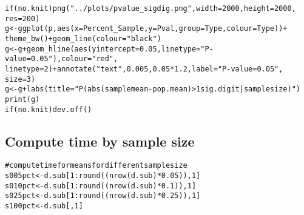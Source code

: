 \documentclass{article}\usepackage[]{graphicx}\usepackage[]{color}
\makeatletter
\newcommand{\hlnum}[1]{\textcolor[rgb]{0.863,0.196,0.184}{#1}}%
\newcommand{\hlstr}[1]{\textcolor[rgb]{0.863,0.196,0.184}{#1}}%
\newcommand{\hlcom}[1]{\textcolor[rgb]{0.345,0.431,0.459}{#1}}%
\newcommand{\hlopt}[1]{\textcolor[rgb]{0.576,0.631,0.631}{#1}}%
\newcommand{\hlstd}[1]{\textcolor[rgb]{0.514,0.58,0.588}{#1}}%
\newcommand{\hlkwa}[1]{\textcolor[rgb]{0.796,0.294,0.086}{#1}}%
\newcommand{\hlkwb}[1]{\textcolor[rgb]{0.522,0.6,0}{#1}}%
\newcommand{\hlkwc}[1]{\textcolor[rgb]{0.796,0.294,0.086}{#1}}%
\newcommand{\hlkwd}[1]{\textcolor[rgb]{0.576,0.631,0.631}{#1}}%
\newenvironment{kframe}{%
 \def\at@end@of@kframe{}%
 \ifinner\ifhmode%
  \def\at@end@of@kframe{\end{minipage}}%
  \begin{minipage}{\columnwidth}%
 \fi\fi%
 \def\FrameCommand##1{\hskip\@totalleftmargin \hskip-\fboxsep
 \colorbox{shadecolor}{##1}\hskip-\fboxsep
     \hskip-\linewidth \hskip-\@totalleftmargin \hskip\columnwidth}%
 \MakeFramed {\advance\hsize-\width
   \@totalleftmargin\z@ \linewidth\hsize
   \@setminipage}}%
 {\par\unskip\endMakeFramed%
 \at@end@of@kframe}
\newenvironment{knitrout}{}{} %
\makeatother
\begin{document}
\begin{knitrout}
\color{fgcolor}\begin{kframe}
\begin{alltt}
\hlkwa{if} \hlstd{(no.knit)} \hlkwd{png}\hlstd{(}\hlstr{"../plots/pvalue_sigdig.png"}\hlstd{,} \hlkwc{width} \hlstd{=} \hlnum{2000}\hlstd{,} \hlkwc{height} \hlstd{=} \hlnum{2000}\hlstd{,}
    \hlkwc{res} \hlstd{=} \hlnum{200}\hlstd{)}
\hlstd{g} \hlkwb{<-} \hlkwd{ggplot}\hlstd{(p,} \hlkwd{aes}\hlstd{(}\hlkwc{x} \hlstd{= Percent_Sample,} \hlkwc{y} \hlstd{= Pval,} \hlkwc{group} \hlstd{= Type,} \hlkwc{colour} \hlstd{= Type))} \hlopt{+}
    \hlkwd{theme_bw}\hlstd{()} \hlopt{+} \hlkwd{geom_line}\hlstd{(}\hlkwc{colour} \hlstd{=} \hlstr{"black"}\hlstd{)}
\hlstd{g} \hlkwb{<-} \hlstd{g} \hlopt{+} \hlkwd{geom_hline}\hlstd{(}\hlkwd{aes}\hlstd{(}\hlkwc{yintercept} \hlstd{=} \hlnum{0.05}\hlstd{,} \hlkwc{linetype} \hlstd{=} \hlstr{"P-value = 0.05"}\hlstd{),} \hlkwc{colour} \hlstd{=} \hlstr{"red"}\hlstd{,}
    \hlkwc{linetype} \hlstd{=} \hlnum{2}\hlstd{)} \hlopt{+} \hlkwd{annotate}\hlstd{(}\hlstr{"text"}\hlstd{,} \hlnum{0.005}\hlstd{,} \hlnum{0.05} \hlopt{*} \hlnum{1.2}\hlstd{,} \hlkwc{label} \hlstd{=} \hlstr{"P-value = 0.05"}\hlstd{,}
    \hlkwc{size} \hlstd{=} \hlnum{3}\hlstd{)}
\hlstd{g} \hlkwb{<-} \hlstd{g} \hlopt{+} \hlkwd{labs}\hlstd{(}\hlkwc{title} \hlstd{=} \hlstr{"P(abs(sample mean - pop. mean) > 1 sig. digit | sample size)"}\hlstd{)}
\hlkwd{print}\hlstd{(g)}
\hlkwa{if} \hlstd{(no.knit)} \hlkwd{dev.off}\hlstd{()}
\end{alltt}
\end{kframe}
\end{knitrout}

\subsection{Compute time by sample size}

\begin{knitrout}
\color{fgcolor}\begin{kframe}
\begin{alltt}
\hlcom{# compute time for means for different sample size}
\hlstd{s005pct} \hlkwb{<-} \hlstd{d.sub[}\hlnum{1}\hlopt{:}\hlkwd{round}\hlstd{((}\hlkwd{nrow}\hlstd{(d.sub)} \hlopt{*} \hlnum{0.05}\hlstd{)),} \hlnum{1}\hlstd{]}
\hlstd{s010pct} \hlkwb{<-} \hlstd{d.sub[}\hlnum{1}\hlopt{:}\hlkwd{round}\hlstd{((}\hlkwd{nrow}\hlstd{(d.sub)} \hlopt{*} \hlnum{0.1}\hlstd{)),} \hlnum{1}\hlstd{]}
\hlstd{s025pct} \hlkwb{<-} \hlstd{d.sub[}\hlnum{1}\hlopt{:}\hlkwd{round}\hlstd{((}\hlkwd{nrow}\hlstd{(d.sub)} \hlopt{*} \hlnum{0.25}\hlstd{)),} \hlnum{1}\hlstd{]}
\hlstd{s100pct} \hlkwb{<-} \hlstd{d.sub[,} \hlnum{1}\hlstd{]}
\end{alltt}
\end{kframe}
\end{knitrout}
\end{document}
